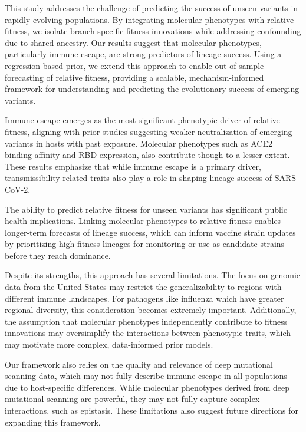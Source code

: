 This study addresses the challenge of predicting the success of unseen variants in rapidly evolving populations.
By integrating molecular phenotypes with relative fitness, we isolate branch-specific fitness innovations while addressing confounding due to shared ancestry.
Our results suggest that molecular phenotypes, particularly immune escape, are strong predictors of lineage success.
Using a regression-based prior, we extend this approach to enable out-of-sample forecasting of relative fitness, providing a scalable, mechanism-informed framework for understanding and predicting the evolutionary success of emerging variants.

Immune escape emerges as the most significant phenotypic driver of relative fitness, aligning with prior studies suggesting weaker neutralization of emerging variants in hosts with past exposure.
Molecular phenotypes such as ACE2 binding affinity and RBD expression, also contribute though to a lesser extent.
These results emphasize that while immune escape is a primary driver, transmissibility-related traits also play a role in shaping lineage success of SARS-CoV-2.

The ability to predict relative fitness for unseen variants has significant public health implications.
Linking molecular phenotypes to relative fitness enables longer-term forecasts of lineage success, which can inform vaccine strain updates by prioritizing high-fitness lineages for monitoring or use as candidate strains before they reach dominance.


Despite its strengths, this approach has several limitations.
The focus on genomic data from the United States may restrict the generalizability to regions with different immune landscapes.
For pathogens like influenza which have greater regional diversity, this consideration becomes extremely important.
Additionally, the assumption that molecular phenotypes independently contribute to fitness innovations may oversimplify the interactions between phenotypic traits, which may motivate more complex, data-informed prior models.

Our framework also relies on the quality and relevance of deep mutational scanning data, which may not fully describe immune escape in all populations due to host-specific differences.
While molecular phenotypes derived from deep mutational scanning are powerful, they may not fully capture complex interactions, such as epistasis.
These limitations also suggest future directions for expanding this framework.

